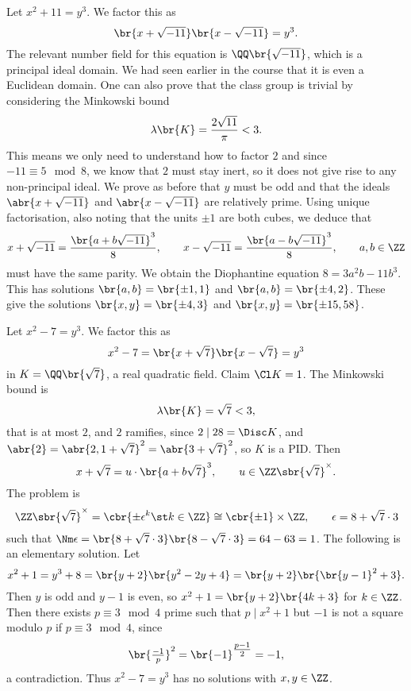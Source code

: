 \begin{example*}
Let $ x^2 + 11 = y^3 $. We factor this as
$$ \br{x + \sqrt{-11}}\br{x - \sqrt{-11}} = y^3. $$
The relevant number field for this equation is $ \QQ\br{\sqrt{-11}} $, which is a principal ideal domain. We had seen earlier in the course that it is even a Euclidean domain. One can also prove that the class group is trivial by considering the Minkowski bound
$$ \lambda\br{K} = \dfrac{2\sqrt{11}}{\pi} < 3. $$
This means we only need to understand how to factor $ 2 $ and since $ -11 \equiv 5 \mod 8 $, we know that $ 2 $ must stay inert, so it does not give rise to any non-principal ideal. We prove as before that $ y $ must be odd and that the ideals $ \abr{x + \sqrt{-11}} $ and $ \abr{x - \sqrt{-11}} $ are relatively prime. Using unique factorisation, also noting that the units $ \pm 1 $ are both cubes, we deduce that
$$ x + \sqrt{-11} = \dfrac{\br{a + b\sqrt{-11}}^3}{8}, \qquad x - \sqrt{-11} = \dfrac{\br{a - b\sqrt{-11}}^3}{8}, \qquad a, b \in \ZZ $$
must have the same parity. We obtain the Diophantine equation $ 8 = 3a^2b - 11b^3 $. This has solutions $ \br{a, b} = \br{\pm 1, 1} $ and $ \br{a, b} = \br{\pm 4, 2} $. These give the solutions $ \br{x, y} = \br{\pm 4, 3} $ and $ \br{x, y} = \br{\pm 15, 58} $.
\end{example*}

\begin{example*}
Let $ x^2 - 7 = y^3 $. We factor this as
$$ x^2 - 7 = \br{x + \sqrt{7}}\br{x - \sqrt{7}} = y^3 $$
in $ K = \QQ\br{\sqrt{7}} $, a real quadratic field. Claim $ \Cl K = 1 $. The Minkowski bound is
$$ \lambda\br{K} = \sqrt{7} < 3, $$
that is at most $ 2 $, and $ 2 $ ramifies, since $ 2 \mid 28 = \Disc K $, and $ \abr{2} = \abr{2, 1 + \sqrt{7}}^2 = \abr{3 + \sqrt{7}}^2 $, so $ K $ is a PID. Then
$$ x + \sqrt{7} = u \cdot \br{a + b\sqrt{7}}^3, \qquad u \in \ZZ\sbr{\sqrt{7}}^\times. $$
The problem is
$$ \ZZ\sbr{\sqrt{7}}^\times = \cbr{\pm\epsilon^k \st k \in \ZZ} \cong \cbr{\pm 1} \times \ZZ, \qquad \epsilon = 8 + \sqrt{7} \cdot 3 $$
such that $ \Nm \epsilon = \br{8 + \sqrt{7} \cdot 3}\br{8 - \sqrt{7} \cdot 3} = 64 - 63 = 1 $. The following is an elementary solution. Let
$$ x^2 + 1 = y^3 + 8 = \br{y + 2}\br{y^2 - 2y + 4} = \br{y + 2}\br{\br{y - 1}^2 + 3}. $$
Then $ y $ is odd and $ y - 1 $ is even, so $ x^2 + 1 = \br{y + 2}\br{4k + 3} $ for $ k \in \ZZ $. Then there exists $ p \equiv 3 \mod 4 $ prime such that $ p \mid x^2 + 1 $ but $ -1 $ is not a square modulo $ p $ if $ p \equiv 3 \mod 4 $, since
$$ \br{\tfrac{-1}{p}}^2 = \br{-1}^{\tfrac{p - 1}{2}} = -1, $$
a contradiction. Thus $ x^2 - 7 = y^3 $ has no solutions with $ x, y \in \ZZ $.
\end{example*}

